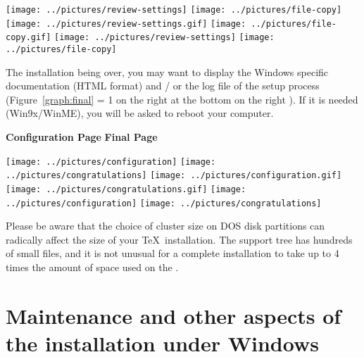 \documentclass{article}
\begin{document}
\begin{description}
\begin{figure*}[!htb]
  \begin{center}
  \ifnum {}
      \texttt{[image: ../pictures/review-settings]}\hfill%
      \texttt{[image: ../pictures/file-copy]}
  \else
    \ifnum {}
          \texttt{[image: ../pictures/review-settings.gif]}\hfill%
          \texttt{[image: ../pictures/file-copy.gif]}
    \else
          \texttt{[image: ../pictures/review-settings]}\hfill%
          \texttt{[image: ../pictures/file-copy]}%
    \fi
  \fi
 \end{center}
 \caption{Review Page / File Copy Page}
 \label{graph:review}\label{graph:file-copy}
\end{figure*}
\item[Final Page] The installation being over, you may want to display
  the Windows specific documentation (HTML format) and / or the log
  file of the setup process  (Figure~\ref{graph:final}
  \ifnum \Status = 1
  on the right%
  \else\ifnum {}
  at the bottom%
  \else
  on the right%
  \fi\fi
  ). If it is needed (Win9x/WinME), you will
  be asked to reboot your computer.
\end{description}

\begin{figure*}[!htb]
  \textbf{Configuration Page}\hfill%
  \textbf{Final Page}
  \begin{center}
  \ifnum {}
      \texttt{[image: ../pictures/configuration]}\hfill%
      \texttt{[image: ../pictures/congratulations]}
  \else
    \ifnum {}
          \texttt{[image: ../pictures/configuration.gif]}\hfill%
          \texttt{[image: ../pictures/congratulations.gif]}
    \else
          \texttt{[image: ../pictures/configuration]}\hfill%
          \texttt{[image: ../pictures/congratulations]}%
    \fi
  \fi
 \end{center}
 \caption{Configuration Page / Final page}
\label{graph:configuration}\label{graph:final}
\end{figure*}

Please be aware that the choice of cluster size on DOS disk
partitions can radically affect the size of your \TeX\
installation. The support tree has hundreds of small files, and it is
not unusual for a complete installation to take up to 4 times the
amount of space used on the \CD.


\section[Maintenance and other aspects of the \protect\TeXLive{}
installation under Windows]{Maintenance and other aspects of the \protect\TeXLive{}
installation under Windows}
\end{document}
